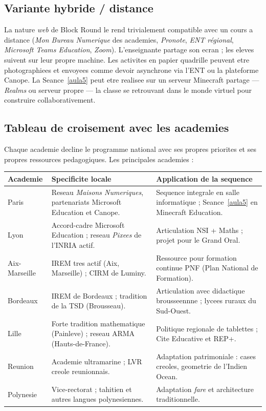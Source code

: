 \documentclass[12pt,a4paper]{scrartcl}
\begin{document}
\subsection{Variante hybride / distance}
La nature \emph{web} de Block Round le rend trivialement compatible avec un cours a distance (\emph{Mon Bureau Numerique} des academies, \emph{Pronote}, \emph{ENT régional}, \emph{Microsoft Teams Education}, \emph{Zoom}). L'enseignant\textperiodcentered e partage son ecran ; les eleves suivent sur leur propre machine. Les activites en papier quadrille peuvent etre photographiees et envoyees comme devoir asynchrone via l'ENT ou la plateforme Canope. La Seance~\ref{aula5} peut etre realisee sur un serveur Minecraft partage --- \emph{Realms} ou serveur propre --- la classe se retrouvant dans le monde virtuel pour construire collaborativement.

\subsection{Tableau de croisement avec les academies}

Chaque academie decline le programme national avec ses propres priorites et ses propres ressources pedagogiques. Les principales academies :

\begin{center}
\small
\begin{tabularx}{\textwidth}{@{}p{}p{}X@{}}
\toprule
\textbf{Academie} & \textbf{Specificite locale} & \textbf{Application de la sequence} \\
\midrule
Paris & Reseau \emph{Maisons Numeriques}, partenariats Microsoft Education et Canope. & Sequence integrale en salle informatique ; Seance~\ref{aula5} en Minecraft Education. \\
\addlinespace[3pt]
Lyon & Accord-cadre Microsoft Education ; reseau \emph{Pixees} de l'INRIA actif. & Articulation NSI + Maths ; projet pour le Grand Oral. \\
\addlinespace[3pt]
Aix-Marseille & IREM tres actif (Aix, Marseille) ; CIRM de Luminy. & Ressource pour formation continue PNF (Plan National de Formation). \\
\addlinespace[3pt]
Bordeaux & IREM de Bordeaux ; tradition de la TSD (Brousseau). & Articulation avec didactique brousseennne ; lycees ruraux du Sud-Ouest. \\
\addlinespace[3pt]
Lille & Forte tradition mathematique (Painleve) ; reseau ARMA (Hauts-de-France). & Politique regionale de tablettes ; Cite Educative et REP+. \\
\addlinespace[3pt]
Reunion & Academie ultramarine ; LVR creole reunionnais. & Adaptation patrimoniale : cases creoles, geometrie de l'Indien Ocean. \\
\addlinespace[3pt]
Polynesie & Vice-rectorat ; tahitien et autres langues polynesiennes. & Adaptation \emph{fare} et architecture traditionnelle. \\
\bottomrule
\end{tabularx}
\end{center}
\end{document}
